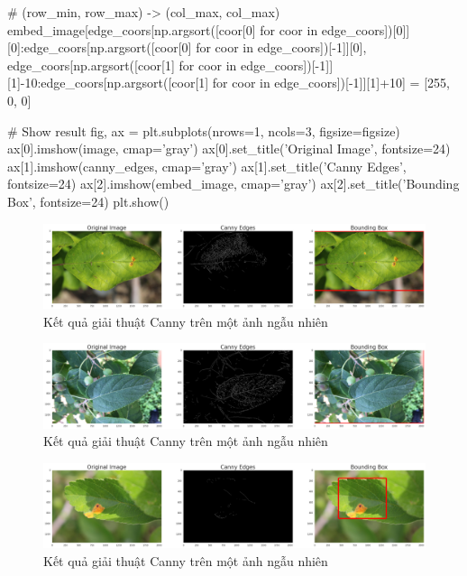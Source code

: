 \documentclass{article}
\begin{document}
\begin{python}
			# (row_min, row_max) -> (col_max, col_max)
			embed_image[edge_coors[np.argsort([coor[0] for coor in edge_coors])[0]][0]:edge_coors[np.argsort([coor[0] for coor in edge_coors])[-1]][0], edge_coors[np.argsort([coor[1] for coor in edge_coors])[-1]][1]-10:edge_coors[np.argsort([coor[1] for coor in edge_coors])[-1]][1]+10] = [255, 0, 0]
		
			# Show result
			fig, ax = plt.subplots(nrows=1, ncols=3, figsize=figsize)
			ax[0].imshow(image, cmap='gray')
			ax[0].set_title('Original Image', fontsize=24)
			ax[1].imshow(canny_edges, cmap='gray')
			ax[1].set_title('Canny Edges', fontsize=24)
			ax[2].imshow(embed_image, cmap='gray')
			ax[2].set_title('Bounding Box', fontsize=24)
			plt.show()
	\end{python}
	\begin{figure}[H]
		\centering
		\includegraphics[width=1\linewidth]{images/canny_edge_detector.png}
		\caption{Kết quả giải thuật Canny trên một ảnh ngẫu nhiên}
		\label{fig:writing-thesis}
	\end{figure}
	\begin{figure}[H]
		\centering
		\includegraphics[width=1\linewidth]{images/canny_edge_detector_1.png}
		\caption{Kết quả giải thuật Canny trên một ảnh ngẫu nhiên}
		\label{fig:writing-thesis}
	\end{figure}
	\begin{figure}[H]
		\centering
		\includegraphics[width=1\linewidth]{images/canny_edge_detector_2.png}
		\caption{Kết quả giải thuật Canny trên một ảnh ngẫu nhiên}
		\label{fig:writing-thesis}
	\end{figure}
\end{document}
